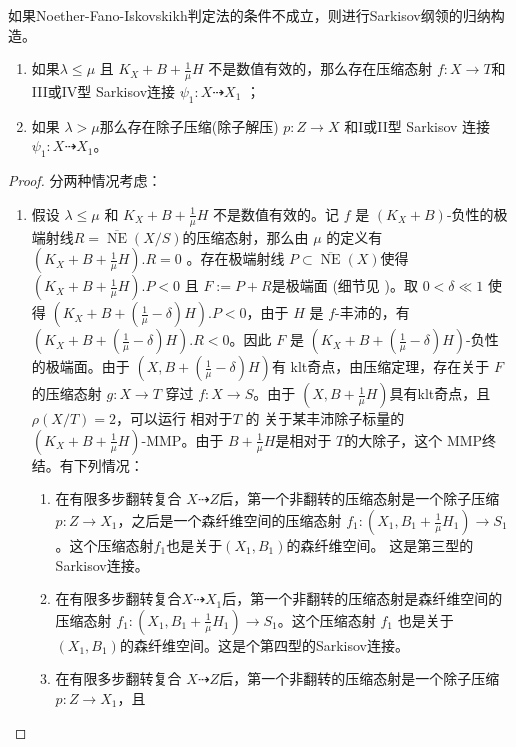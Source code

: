如果Noether-Fano-Iskovskikh判定法的条件不成立，则进行Sarkisov纲领的归纳构造。
\begin{lemma}
  \begin{enumerate}
    \item 如果$ \lambda\leqslant\mu $ 且 $ K_X+B+\frac{1}{\mu}H $ 不是数值有效的，那么存在压缩态射 $f:X \to T$和 III或IV型 Sarkisov连接 $\psi_{1}:X\dashrightarrow X_{1}$ ；
    \item  如果 $ \lambda>\mu $那么存在除子压缩(除子解压) $p:Z\to X$ 和I或II型 Sarkisov 连接 $ \psi_{1}:X\dashrightarrow X_{1}$。
  \end{enumerate}
\end{lemma}
\begin{proof}
  分两种情况考虑：
  \begin{enumerate}
    \item 假设 $\lambda\leqslant \mu$ 和  $ K_X+B+\frac{1}{\mu}H $ 不是数值有效的。记 $ f $ 是 $ (K_X+B) $-负性的极端射线$ R= \overline{\operatorname{ NE }}(X/S) $的压缩态射，那么由 $\mu$ 的定义有$ (K_X+B+\frac{1}{\mu}H).R=0 $ 。存在极端射线 $ P \subset \overline{\operatorname{ NE }}(X) $使得$ (K_X+B+\frac{1}{\mu}H).P<0 $ 且 $ F:=P+R $是极端面  (细节见 \cite [5.4.2]{cortiFactoringBirationalMaps} )。取  $ 0<\delta\ll 1 $ 使得 $ (K_X+B+(\frac{1}{\mu}-\delta)H).P<0 $，由于  $H$ 是 $f$-丰沛的，有 $  (K_X+B+(\frac{1}{\mu}-\delta)H).R<0 $。因此 $ F $ 是 $  (K_X+B+(\frac{1}{\mu}-\delta)H) $-负性的极端面。由于 $ (X,B+(\frac{1}{\mu}-\delta)H) $有 klt奇点，由压缩定理，存在关于 $F$ 的压缩态射 $ g:X\to T $  穿过 $ f:X\to S $。由于  $ (X,B+\frac{1}{\mu}H) $具有klt奇点，且 $ \rho(X/T)=2 $，可以运行 相对于$T$ 的 关于某丰沛除子标量的 $ (K_X+B+\frac{1}{\mu}H) $-MMP。由于 $ B+\frac{1}{\mu}H $是相对于 $T$的大除子，这个 MMP终结。有下列情况：
    \begin{enumerate}
      \item 在有限多步翻转复合 $ X\dashrightarrow Z $后，第一个非翻转的压缩态射是一个除子压缩 $ p:Z\to X_1 $，之后是一个森纤维空间的压缩态射 $f_{1}:(X_{1},B_{1}+\frac{1}{\mu}H_{1})\to S_1$。这个压缩态射$f_1$也是关于$(X_{1},B_{1})$的森纤维空间。
      这是第三型的Sarkisov连接。
      \item 在有限多步翻转复合$ X\dashrightarrow X_1 $后，第一个非翻转的压缩态射是森纤维空间的压缩态射 $ f_1:(X_1,B_1+\frac{1}{\mu}H_1)\to S_{1} $。这个压缩态射 $f_1$ 也是关于 $(X_{1},B_{1})$的森纤维空间。这是个第四型的Sarkisov连接。
      \item 在有限多步翻转复合 $ X\dashrightarrow Z $后，第一个非翻转的压缩态射是一个除子压缩 $ p:Z\to X_1 $，且

\end{enumerate}
\end{enumerate}
\end{proof}
